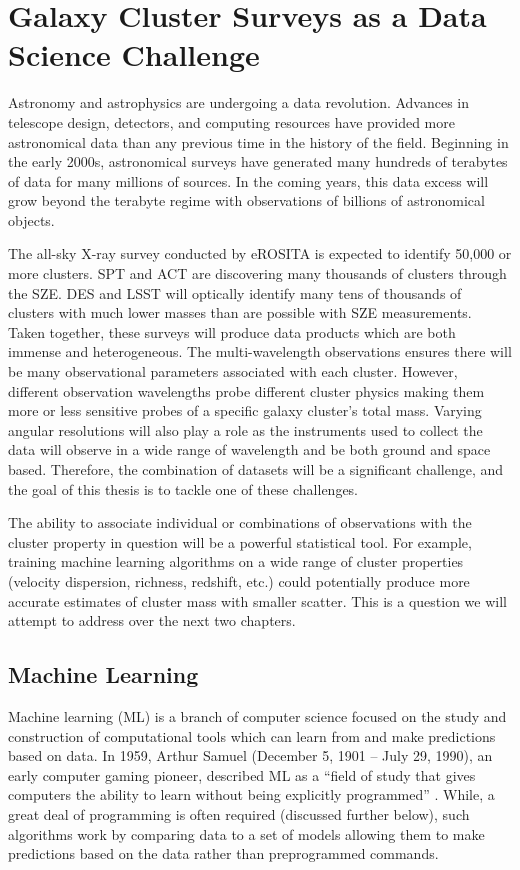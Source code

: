 \section{Galaxy Cluster Surveys as a Data Science Challenge}
Astronomy and astrophysics are undergoing a data revolution. Advances in telescope design, detectors, and computing resources have provided more astronomical data than any previous time in the history of the field. Beginning in the early 2000s, astronomical surveys have generated many hundreds of terabytes of data for many millions of sources. In the coming years, this data excess will grow beyond the terabyte regime with observations of billions of astronomical objects. 

The all-sky X-ray survey conducted by eROSITA is expected to identify 50,000 or more clusters. SPT and ACT are discovering many thousands of clusters through the SZE. DES and LSST will optically identify many tens of thousands of clusters with much lower masses than are possible with SZE measurements. Taken together, these surveys will produce data products which are both immense and heterogeneous. The multi-wavelength observations ensures there will be many observational parameters associated with each cluster. However, different observation wavelengths probe different cluster physics making them more or less sensitive probes of a specific galaxy cluster's total mass. Varying angular resolutions will also play a role as the instruments used to collect the data will observe in a wide range of wavelength and be both ground and space based. Therefore, the combination of datasets will be a significant challenge, and the goal of this thesis is to tackle one of these challenges.

The ability to associate individual or combinations of observations with the cluster property in question will be a powerful statistical tool. For example, training machine learning algorithms on a wide range of cluster properties (velocity dispersion, richness, redshift, etc.) could potentially produce more accurate estimates of cluster mass with smaller scatter. This is a question we will attempt to address over the next two chapters. 

\subsection{Machine Learning}
Machine learning (ML) is a branch of computer science focused on the study and construction of computational tools which can learn from and make predictions based on data. In 1959, Arthur Samuel (December 5, 1901 -- July 29, 1990), an early computer gaming pioneer, described ML as a ``field of study that gives computers the ability to learn without being explicitly programmed'' \citep{simon2013}. While, a great deal of programming is often required (discussed further below), such algorithms work by comparing data to a set of models allowing them to make predictions based on the data rather than preprogrammed commands.

